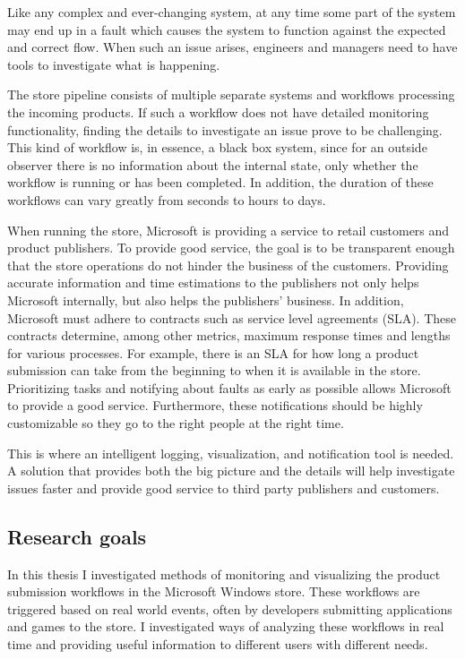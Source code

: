 \documentclass[english,12pt,a4paper,pdftex,sci,utf8]{aaltothesis}
\theoremstyle{definition}
\begin{document}
Like any complex and ever-changing system, at any time some part of the system may end up in a fault
which causes the system to function against the expected and correct flow.
When such an issue arises, engineers and managers need to have tools to investigate what is happening. 

The store pipeline consists of multiple separate systems and workflows processing the incoming products.
If such a workflow does not have detailed monitoring functionality, 
finding the details to investigate an issue prove to be challenging.
This kind of workflow is, in essence, a black box system, since for an outside observer there is no information
about the internal state, only whether the workflow is running or has been completed.
In addition, the duration of these workflows can vary greatly from seconds to hours to days. 

When running the store, Microsoft is providing a service to retail customers and product publishers.
To provide good service, the goal is to be transparent enough that the store operations do not hinder the
business of the customers. Providing accurate information and time estimations to the publishers
not only helps Microsoft internally, but also helps the publishers' business.
In addition, Microsoft must adhere to contracts such as
service level agreements (SLA). These contracts determine, among other metrics, 
maximum response times and lengths for various processes.
For example, there is an SLA for how long a product submission can take from the beginning to when it is available in the store.
Prioritizing tasks and notifying about faults as early as possible allows Microsoft to provide a good service. 
Furthermore, these notifications should be highly customizable so they go to the right people at the right time.

This is where an intelligent logging, visualization, and notification tool is needed. 
A solution that provides both the big picture and the details will help investigate issues faster and
provide good service to third party publishers and customers.

\subsection{Research goals}
In this thesis I investigated methods of monitoring and visualizing the product submission workflows in the Microsoft Windows store.
These workflows are triggered based on real world events, often by developers submitting applications and games to the store.
I investigated ways of analyzing these workflows in real time and providing useful information to different users with different needs. 
\end{document}
